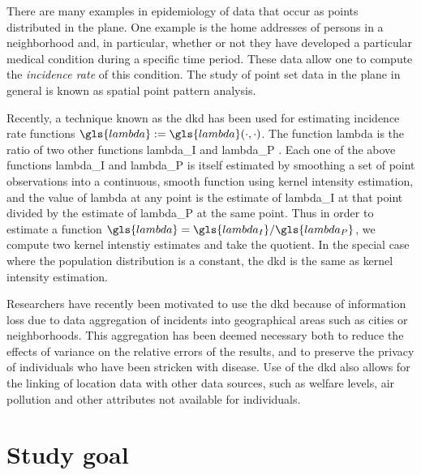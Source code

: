

There are many examples in epidemiology of data that occur as points distributed in the plane.
One example is
the home addresses of persons in a neighborhood and,
in particular,
whether or not they have developed a particular medical condition during a specific time period.
These data allow one to compute the \textit{\gls{incidence rate}} of this condition.
The study of point set data in the plane in general is known as spatial point pattern analysis.

Recently, a technique known as the \gls{dkd} has been used for estimating \gls{incidence rate} functions
$\gls{lambda} := \gls{lambda}\dotdot$.
The function \gls{lambda} is the ratio of two other functions \gls{lambda_I} and \gls{lambda_P} \citep{portnov2009studying,kloog2009using,zusman2012residential}.
Each one of the above functions \gls{lambda_I} and \gls{lambda_P}
is itself estimated by smoothing a set of point observations into a continuous,
smooth function \citep{bithell1990application} using \gls{kernel intensity estimation},
and the value of \gls{lambda} at any point is the estimate of \gls{lambda_I} at that point
divided by the estimate of \gls{lambda_P} at the same point.
Thus in order to estimate a function $\gls{lambda} = \gls{lambda_I}/\gls{lambda_P}$,
we compute two kernel intenstiy estimates and take the quotient.
In the special case where the population distribution is a constant,
the \gls{dkd} is the same as \gls{kernel intensity estimation}.

Researchers have recently been motivated to use the \gls{dkd} because of information loss
due to data aggregation of incidents into geographical areas such as cities or neighborhoods.
This aggregation has been deemed necessary both
to reduce the effects of variance on the relative errors of the results,
and to preserve the privacy of individuals who have been stricken with disease.
Use of the \gls{dkd} also allows for the linking of location data with other data sources,
such as welfare levels, air pollution and other attributes not available for individuals.

\section{Study goal}
\label{sec:introduction:goal}

